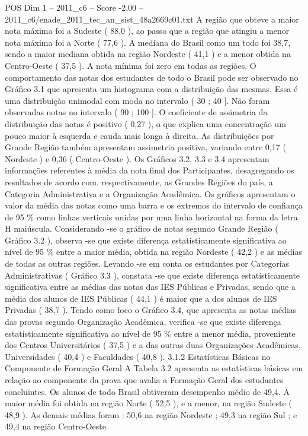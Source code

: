 \begin{textsample}{POS Dim 1 – 2011\_c6 – Score -2.00 – 2011\_c6/enade\_2011\_tec\_an\_sist\_48a2669c01.txt}
A região que obteve a maior nota máxima foi a Sudeste ( 88,0 ), ao passo que a região que atingiu a menor nota máxima foi a Norte ( 77,6 ).
A mediana do Brasil como um todo foi 38,7, sendo a maior mediana obtida na região Nordeste ( 41,1 ) e a menor obtida na Centro-Oeste ( 37,5 ).
A nota mínima foi zero em todas as regiões.
O comportamento das notas dos estudantes de todo o Brasil pode ser observado no Gráfico 3.1 que apresenta um histograma com a distribuição das mesmas.
Essa é uma distribuição unimodal com moda no intervalo ( 30 ; 40 ].
Não foram observadas notas no intervalo ( 90 ; 100 ].
O coeficiente de assimetria da distribuição das notas é positivo ( 0,27 ), o que explica uma concentração um pouco maior à esquerda e cauda mais longa à direita.
As distribuições por Grande Região também apresentam assimetria positiva, variando entre 0,17 ( Nordeste ) e 0,36 ( Centro-Oeste ).
Os Gráficos 3.2, 3.3 e 3.4 apresentam informações referentes à média da nota final dos Participantes, desagregando os resultados de acordo com, respectivamente, as Grandes Regiões do país, a Categoria Administrativa e a Organização Acadêmica.
Os gráficos apresentam o valor da média das notas como uma barra e os extremos do intervalo de confiança de 95 \% como linhas verticais unidas por uma linha horizontal na forma da letra H maiúscula.
Considerando -se o gráfico de notas segundo Grande Região ( Gráfico 3.2 ), observa -se que existe diferença estatisticamente significativa ao nível de 95 \% entre a maior média, obtida na região Nordeste ( 42,2 ) e as médias de todas as outras regiões.
Levando -se em conta os estudantes por Categorias Administrativas ( Gráfico 3.3 ), constata -se que existe diferença estatisticamente significativa entre as médias das notas das IES Públicas e Privadas, sendo que a média dos alunos de IES Públicas ( 44,1 ) é maior que a dos alunos de IES Privadas ( 38,7 ).
Tendo como foco o Gráfico 3.4, que apresenta as notas médias das provas segundo Organização Acadêmica, verifica -se que existe diferença estatisticamente significativa ao nível de 95 \% entre a menor média, proveniente dos Centros Universitários ( 37,5 ) e a das outras duas Organizações Acadêmicas, Universidades ( 40,4 ) e Faculdades ( 40,8 ). 3.1.2 Estatísticas Básicas no Componente de Formação Geral A Tabela 3.2 apresenta as estatísticas básicas em relação ao componente da prova que avalia a Formação Geral dos estudantes concluintes.
Os alunos de todo Brasil obtiveram desempenho médio de 49,4.
A maior média foi obtida na região Norte ( 52,5 ), e a menor, na região Sudeste ( 48,9 ).
As demais médias foram : 50,6 na região Nordeste ; 49,3 na região Sul ; e 49,4 na região Centro-Oeste.

\end{textsample}
